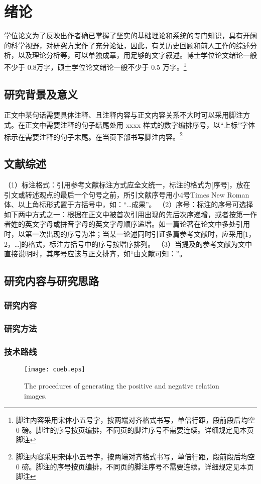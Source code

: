 \chapter{绪论}
学位论文为了反映出作者确已掌握了坚实的基础理论和系统的专门知识，具有开阔的科学视野，对研究方案作了充分论证，因此，有关历史回顾和前人工作的综述分析，以及理论分析等，可以单独成章，用足够的文字叙述。博士学位论文绪论一般不少于 0.8万字，硕士学位论文绪论一般不少于 0.5 万字。\footnote{脚注内容采用宋体小五号字，按两端对齐格式书写，单倍行距，段前段后均空 0 磅。脚注的序号按页编排，不同页的脚注序号不需要连续。详细规定见本页脚注}
\section{研究背景及意义}
正文中某句话需要具体注释、且注释内容与正文内容关系不大时可以采用脚注方式。在正文中需要注释的句子结尾处用 xxxx 样式的数字编排序号，以“上标”字体标示在需要注释的句子末尾。在当页下部书写脚注内容。\footnote{脚注内容采用宋体小五号字，按两端对齐格式书写，单倍行距，段前段后均空 0 磅。脚注的序号按页编排，不同页的脚注序号不需要连续。详细规定见本页脚注}
\section{文献综述}
（1）标注格式：引用参考文献标注方式应全文统一，标注的格式为[序号]，放在引文或转述观点的最后一个句号之前，所引文献序号用小4号Times New Roman体、以上角标形式置于方括号中，如：“…成果”。
（2）序号：标注的序号可选择如下两中方式之一：根据在正文中被首次引用出现的先后次序递增，或者按第一作者姓的英文字母或拼音字母的英文字母顺序递增。如一篇论著在论文中多处引用时，以第一次出现的序号为准；当某一论述同时引证多篇参考文献时，应采用[1，2，…]的格式，标注方括号中的序号按增序排列。
（3）当提及的参考文献为文中直接说明时，其序号应该与正文排齐，如“由文献\cite{pritchard1969statistical}可知：”。

\section{研究内容与研究思路}
\subsection{研究内容}
\subsection{研究方法}
\subsection{技术路线}
\begin{figure}[ht]
\centering
\texttt{[image: cueb.eps]}
\caption{The procedures of generating the positive and negative relation images.}
\label{smi}
\end{figure}

